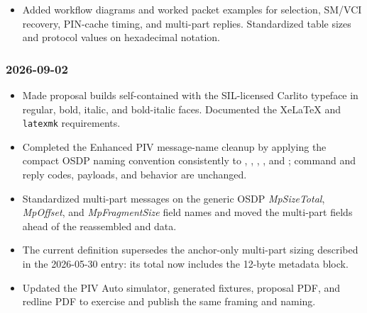 \begin{itemize}
    and completion of requests affected by expiration. Bounded PD timeout defaults to 1--255
    seconds. Reassigned SPE flags  for retention across removal and  for Auto
    Execute; added result  for credential communication failure or timeout, requiring
    preparation to restart after an unconfirmed PIN VERIFY. Applied the same restart rule to pairing
    VERIFY timeouts, reported through existing PIVERROR  (smart-card timeout).
  \item Added workflow diagrams and worked packet examples for selection, SM/VCI recovery, PIN-cache
    timing, and multi-part replies. Standardized table sizes and protocol values on hexadecimal
    notation.
\end{itemize}

\subsubsection*{2026-09-02}
\begin{itemize}
  \item Made proposal builds self-contained with the SIL-licensed Carlito typeface in regular, bold,
    italic, and bold-italic faces. Documented the XeLaTeX and \texttt{latexmk} requirements.
  \item Completed the Enhanced PIV message-name cleanup by applying the compact OSDP naming
    convention consistently to , ,
    , , and ; command
    and reply codes, payloads, and behavior are unchanged.
  \item Standardized multi-part messages on the generic OSDP \emph{MpSizeTotal}, \emph{MpOffset},
    and \emph{MpFragmentSize} field names and moved the multi-part fields ahead of the reassembled
     and  data.
  \item The current  definition supersedes the anchor-only multi-part sizing
    described in the 2026-05-30 entry: its total now includes the 12-byte metadata block.
  \item Updated the PIV Auto simulator, generated fixtures, proposal PDF, and redline PDF to
    exercise and publish the same framing and naming.
\end{itemize}

